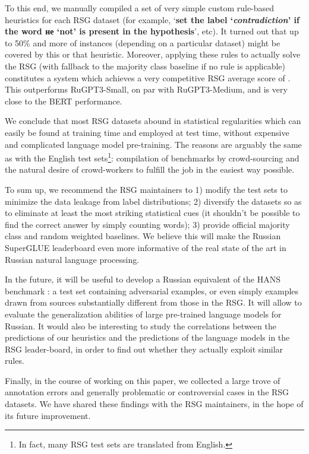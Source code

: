 \documentclass[11pt]{article}
\begin{document}
To this end, we manually compiled a set of very simple custom rule-based heuristics for each RSG dataset (for example, `\textbf{set the label `\textit{contradiction}' if the word \foreignlanguage{russian}{не} `not' is present in the hypothesis}', etc). 
It turned out that up to 50\% and more of instances (depending on a particular dataset) might be covered by this or that heuristic. Moreover, applying these rules to actually solve the RSG (with fallback to the majority class baseline if no rule is applicable) constitutes a system which achieves a very competitive RSG average score of . This outperforms RuGPT3-Small, on par with RuGPT3-Medium, and is very close to the BERT performance.

We conclude that most RSG datasets abound in statistical regularities which can easily be found at training time and employed at test time, without expensive and complicated language model pre-training. The reasons are arguably the same as with the English test sets\footnote{In fact, many RSG test sets are translated from English.}: compilation of benchmarks by crowd-sourcing and the natural desire of crowd-workers to fulfill the job in the easiest way possible. 

To sum up, we recommend the RSG maintainers to 1) modify the test sets to minimize the data leakage from label distributions; 2) diversify the datasets so as to eliminate at least the most striking statistical cues (it shouldn't be possible to find the correct answer by simply counting words); 3) provide official majority class and random weighted baselines. We believe this will make the Russian SuperGLUE leaderboard even more informative of the real state of the art in Russian natural language processing.

In the future, it will be useful to develop a Russian equivalent of the HANS benchmark \cite{mccoy-etal-2019-right}: a test set containing adversarial examples, or even simply examples drawn from sources substantially different from those in the RSG. It will allow to evaluate the generalization abilities of large pre-trained language models for Russian. It would also be interesting to study the correlations between the predictions of our heuristics and the predictions of the language models in the RSG leader-board, in order to find out whether they actually exploit similar rules.

Finally, in the course of working on this paper, we collected a large trove of annotation errors and generally problematic or controversial cases in the RSG datasets. We have shared these findings with the RSG maintainers, in the hope of its future improvement.
\end{document}
